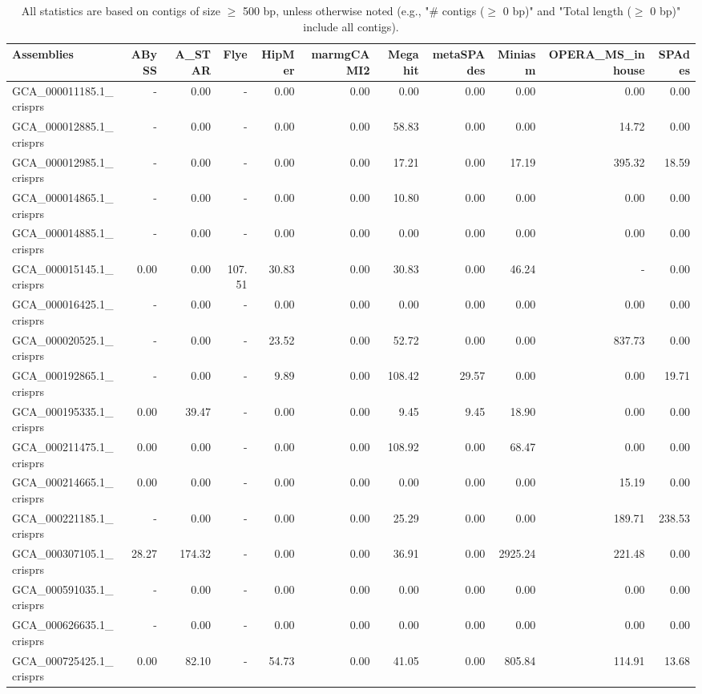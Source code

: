 \documentclass[12pt,a4paper]{article}
\begin{document}
\begin{table}[ht]
\begin{center}
\caption{All statistics are based on contigs of size $\geq$ 500 bp, unless otherwise noted (e.g., "\# contigs ($\geq$ 0 bp)" and "Total length ($\geq$ 0 bp)" include all contigs).}
\begin{tabular}{|l*{10}{|r}|}
\hline
Assemblies & ABySS & A\_STAR & Flye & HipMer & marmgCAMI2 & Megahit & metaSPAdes & Miniasm & OPERA\_MS\_inhouse & SPAdes \\ \hline
GCA\_000011185.1\_crisprs & - & 0.00 & - & 0.00 & 0.00 & 0.00 & 0.00 & 0.00 & 0.00 & 0.00 \\ \hline
GCA\_000012885.1\_crisprs & - & 0.00 & - & 0.00 & 0.00 & 58.83 & 0.00 & 0.00 & 14.72 & 0.00 \\ \hline
GCA\_000012985.1\_crisprs & - & 0.00 & - & 0.00 & 0.00 & 17.21 & 0.00 & 17.19 & 395.32 & 18.59 \\ \hline
GCA\_000014865.1\_crisprs & - & 0.00 & - & 0.00 & 0.00 & 10.80 & 0.00 & 0.00 & 0.00 & 0.00 \\ \hline
GCA\_000014885.1\_crisprs & - & 0.00 & - & 0.00 & 0.00 & 0.00 & 0.00 & 0.00 & 0.00 & 0.00 \\ \hline
GCA\_000015145.1\_crisprs & 0.00 & 0.00 & 107.51 & 30.83 & 0.00 & 30.83 & 0.00 & 46.24 & - & 0.00 \\ \hline
GCA\_000016425.1\_crisprs & - & 0.00 & - & 0.00 & 0.00 & 0.00 & 0.00 & 0.00 & 0.00 & 0.00 \\ \hline
GCA\_000020525.1\_crisprs & - & 0.00 & - & 23.52 & 0.00 & 52.72 & 0.00 & 0.00 & 837.73 & 0.00 \\ \hline
GCA\_000192865.1\_crisprs & - & 0.00 & - & 9.89 & 0.00 & 108.42 & 29.57 & 0.00 & 0.00 & 19.71 \\ \hline
GCA\_000195335.1\_crisprs & 0.00 & 39.47 & - & 0.00 & 0.00 & 9.45 & 9.45 & 18.90 & 0.00 & 0.00 \\ \hline
GCA\_000211475.1\_crisprs & 0.00 & 0.00 & - & 0.00 & 0.00 & 108.92 & 0.00 & 68.47 & 0.00 & 0.00 \\ \hline
GCA\_000214665.1\_crisprs & 0.00 & 0.00 & - & 0.00 & 0.00 & 0.00 & 0.00 & 0.00 & 15.19 & 0.00 \\ \hline
GCA\_000221185.1\_crisprs & - & 0.00 & - & 0.00 & 0.00 & 25.29 & 0.00 & 0.00 & 189.71 & 238.53 \\ \hline
GCA\_000307105.1\_crisprs & 28.27 & 174.32 & - & 0.00 & 0.00 & 36.91 & 0.00 & 2925.24 & 221.48 & 0.00 \\ \hline
GCA\_000591035.1\_crisprs & - & 0.00 & - & 0.00 & 0.00 & 0.00 & 0.00 & 0.00 & 0.00 & 0.00 \\ \hline
GCA\_000626635.1\_crisprs & - & 0.00 & - & 0.00 & 0.00 & 0.00 & 0.00 & 0.00 & 0.00 & 0.00 \\ \hline
GCA\_000725425.1\_crisprs & 0.00 & 82.10 & - & 54.73 & 0.00 & 41.05 & 0.00 & 805.84 & 114.91 & 13.68 \\ \hline
\end{tabular}
\end{center}
\end{table}
\end{document}
